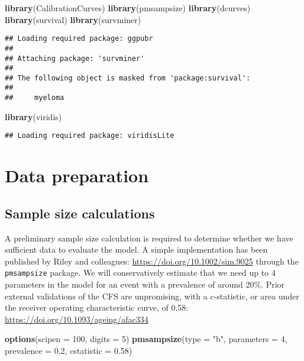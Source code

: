 \documentclass[
]{article}
\newenvironment{Shaded}{\begin{snugshade}}{\end{snugshade}}
\newcommand{\AttributeTok}[1]{\textcolor[rgb]{0.13,0.29,0.53}{#1}}
\newcommand{\DecValTok}[1]{\textcolor[rgb]{0.00,0.00,0.81}{#1}}
\newcommand{\FloatTok}[1]{\textcolor[rgb]{0.00,0.00,0.81}{#1}}
\newcommand{\FunctionTok}[1]{\textcolor[rgb]{0.13,0.29,0.53}{\textbf{#1}}}
\newcommand{\NormalTok}[1]{#1}
\newcommand{\StringTok}[1]{\textcolor[rgb]{0.31,0.60,0.02}{#1}}
\begin{document}
\begin{Shaded}
\begin{Highlighting}[]
\FunctionTok{library}\NormalTok{(CalibrationCurves)}
\FunctionTok{library}\NormalTok{(pmsampsize)}
\FunctionTok{library}\NormalTok{(dcurves)}
\FunctionTok{library}\NormalTok{(survival)}
\FunctionTok{library}\NormalTok{(survminer)}
\end{Highlighting}
\end{Shaded}

\begin{verbatim}
## Loading required package: ggpubr
## 
## Attaching package: 'survminer'
## 
## The following object is masked from 'package:survival':
## 
##     myeloma
\end{verbatim}

\begin{Shaded}
\begin{Highlighting}[]
\FunctionTok{library}\NormalTok{(viridis)}
\end{Highlighting}
\end{Shaded}

\begin{verbatim}
## Loading required package: viridisLite
\end{verbatim}

\hypertarget{data-preparation}{%
\section{Data preparation}\label{data-preparation}}

\hypertarget{sample-size-calculations}{%
\subsection{Sample size calculations}\label{sample-size-calculations}}

A preliminary sample size calculation is required to determine whether
we have sufficient data to evaluate the model. A simple implementation
has been published by Riley and colleagues:
\url{https://doi.org/10.1002/sim.9025} through the \texttt{pmsampsize}
package. We will conservatively estimate that we need up to 4 parameters
in the model for an event with a prevalence of around 20\%. Prior
external validations of the CFS are unpromising, with a c-statistic, or
area under the receiver operating characteristic curve, of 0.58:
\url{https://doi.org/10.1093/ageing/afac334}

\begin{Shaded}
\begin{Highlighting}[]
\FunctionTok{options}\NormalTok{(}\AttributeTok{scipen =} \DecValTok{100}\NormalTok{, }\AttributeTok{digits =} \DecValTok{5}\NormalTok{)}
\FunctionTok{pmsampsize}\NormalTok{(}\AttributeTok{type =} \StringTok{"b"}\NormalTok{,}
           \AttributeTok{parameters =} \DecValTok{4}\NormalTok{, }
           \AttributeTok{prevalence =} \FloatTok{0.2}\NormalTok{,}
           \AttributeTok{cstatistic =} \FloatTok{0.58}\NormalTok{)}
\end{Highlighting}
\end{Shaded}
\end{document}
